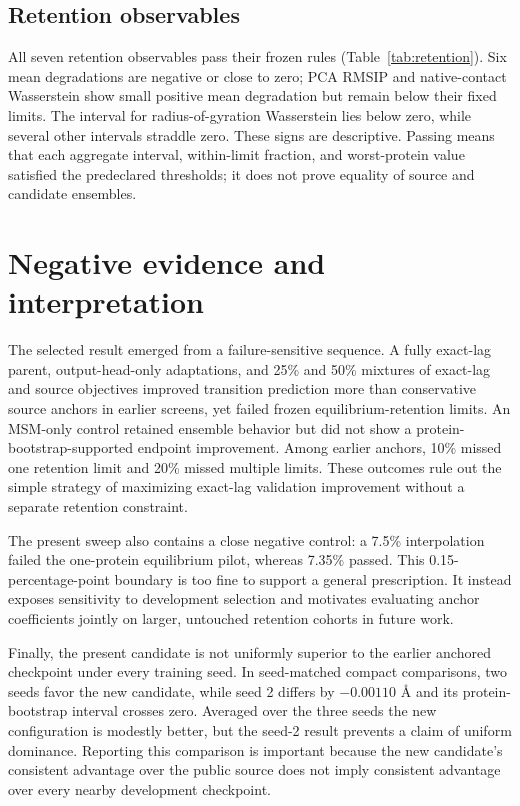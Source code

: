 \documentclass{article}
\begin{document}
\subsection{Retention observables}

All seven retention observables pass their frozen rules (Table~\ref{tab:retention}). Six mean degradations are negative or close to zero; PCA RMSIP and native-contact Wasserstein show small positive mean degradation but remain below their fixed limits. The interval for radius-of-gyration Wasserstein lies below zero, while several other intervals straddle zero. These signs are descriptive. Passing means that each aggregate interval, within-limit fraction, and worst-protein value satisfied the predeclared thresholds; it does not prove equality of source and candidate ensembles.

\section{Negative evidence and interpretation}

The selected result emerged from a failure-sensitive sequence. A fully exact-lag parent, output-head-only adaptations, and 25\% and 50\% mixtures of exact-lag and source objectives improved transition prediction more than conservative source anchors in earlier screens, yet failed frozen equilibrium-retention limits. An MSM-only control retained ensemble behavior but did not show a protein-bootstrap-supported endpoint improvement. Among earlier anchors, 10\% missed one retention limit and 20\% missed multiple limits. These outcomes rule out the simple strategy of maximizing exact-lag validation improvement without a separate retention constraint.

The present sweep also contains a close negative control: a 7.5\% interpolation failed the one-protein equilibrium pilot, whereas 7.35\% passed. This 0.15-percentage-point boundary is too fine to support a general prescription. It instead exposes sensitivity to development selection and motivates evaluating anchor coefficients jointly on larger, untouched retention cohorts in future work.

Finally, the present candidate is not uniformly superior to the earlier anchored checkpoint under every training seed. In seed-matched compact comparisons, two seeds favor the new candidate, while seed 2 differs by $-0.00110$ \AA\@{} and its protein-bootstrap interval crosses zero. Averaged over the three seeds the new configuration is modestly better, but the seed-2 result prevents a claim of uniform dominance. Reporting this comparison is important because the new candidate's consistent advantage over the public source does not imply consistent advantage over every nearby development checkpoint.
\end{document}
